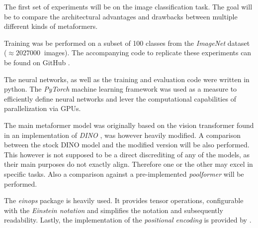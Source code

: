 The first set of experiments will be on the image classification task.
The goal will be to compare the architectural advantages and drawbacks between multiple different kinds of metaformers.

Training was be performed on a subset of 100 classes from the \emph{ImageNet} dataset \cite{imagenetDataset} ($\approx \SI{2027000}{}$ images).
The accompanying code to replicate these experiments can be found on GitHub \cite{selfComputerScience}.

The neural networks, as well as the training and evaluation code were written in python.
The \emph{PyTorch} \cite{pytorchGithub} machine learning framework was used as a measure to efficiently define neural networks and lever the computational capabilities of parallelization via GPUs.

The main metaformer model was originally based on the vision transformer found in an implementation of \emph{DINO} \cite{dinoGithub}, was however heavily modified. 
A comparison between the stock DINO model and the modified version will be also performed.
This however is not supposed to be a direct discrediting of any of the models, as their main purposes do not exactly align.
Therefore one or the other may excel in specific tasks.
Also a comparison against a pre-implemented \emph{poolformer} \cite{poolformerGithub} will be performed.

The \emph{einops} package \cite{einopsGithub} is heavily used. It provides tensor operations, configurable with the \emph{Einstein notation} and simplifies the notation and subsequently readability.
Lastly, the implementation of the \emph{positional encoding} is provided by \cite{positionalEncodingGithub}.
